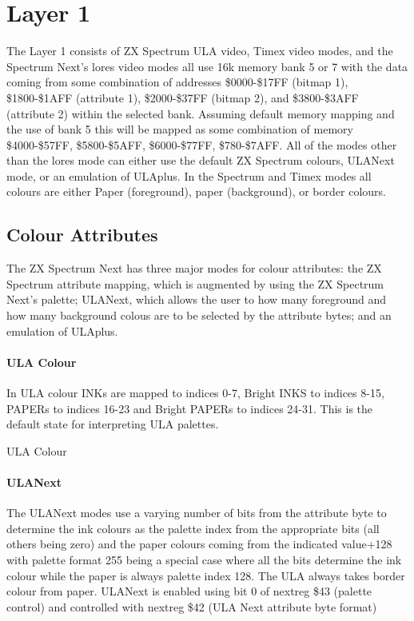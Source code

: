 \section{Layer 1}
The Layer 1 consists of ZX Spectrum ULA video, Timex video modes, and
the Spectrum Next’s lores video modes all use 16k memory bank 5 or 7
with the data coming from some combination of addresses \$0000-\$17FF
(bitmap 1), \$1800-\$1AFF (attribute 1), \$2000-\$37FF (bitmap 2), and
\$3800-\$3AFF (attribute 2) within the selected bank.  Assuming
default memory mapping and the use of bank 5 this will be mapped as
some combination of memory \$4000-\$57FF, \$5800-\$5AFF,
\$6000-\$77FF, \$780-\$7AFF. All of the modes other than the lores
mode can either use the default ZX Spectrum colours, ULANext mode, or
an emulation of ULAplus. In the Spectrum and Timex modes all colours are
either Paper (foreground), paper (background), or border colours.

\subsection{Colour Attributes}
The ZX Spectrum Next has three major modes for colour attributes: the
ZX Spectrum attribute mapping, which is augmented by using the ZX
Spectrum Next's palette; ULANext, which allows the user to how many
foreground and how many background colous are to be selected by the
attribute bytes; and an emulation of ULAplus.

\paragraph{ULA Colour}
In ULA colour INKs are mapped to indices 0-7, Bright INKS to indices
8-15, PAPERs to indices 16-23 and Bright PAPERs to indices 24-31. This
is the default state for interpreting ULA palettes.

\begin{table}[h]\centering
  \caption{ULA Colour}
\end{table}

\paragraph{ULANext}
The ULANext modes use a varying number of bits from the attribute
byte to determine the ink colours as the palette index from the
appropriate bits (all others being zero) and the paper colours coming
from the indicated value+128 with palette format 255 being a special
case where all the bits determine the ink colour while the paper is
always palette index 128. The ULA always takes border colour from
paper. ULANext is enabled using bit 0 of nextreg \$43 (palette
control) and controlled with nextreg \$42 (ULA Next attribute byte
format)

